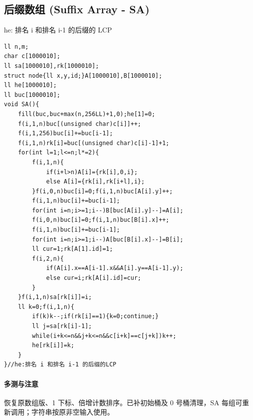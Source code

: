 \subsection{后缀数组 (Suffix Array - SA)}
he: 排名 i 和排名 i-1 的后缀的 LCP
\begin{lstlisting}
ll n,m;
char c[1000010];
ll sa[1000010],rk[1000010];
struct node{ll x,y,id;}A[1000010],B[1000010];
ll he[1000010];
ll buc[1000010];
void SA(){
    fill(buc,buc+max(n,256LL)+1,0);he[1]=0;
	f(i,1,n)buc[(unsigned char)c[i]]++;
	f(i,1,256)buc[i]+=buc[i-1];
	f(i,1,n)rk[i]=buc[(unsigned char)c[i]-1]+1;
	for(int l=1;l<=n;l*=2){
		f(i,1,n){
			if(i+l>n)A[i]={rk[i],0,i};
			else A[i]={rk[i],rk[i+l],i};
		}f(i,0,n)buc[i]=0;f(i,1,n)buc[A[i].y]++;
		f(i,1,n)buc[i]+=buc[i-1];
		for(int i=n;i>=1;i--)B[buc[A[i].y]--]=A[i];
		f(i,0,n)buc[i]=0;f(i,1,n)buc[B[i].x]++;
		f(i,1,n)buc[i]+=buc[i-1];
		for(int i=n;i>=1;i--)A[buc[B[i].x]--]=B[i];
		ll cur=1;rk[A[1].id]=1;
		f(i,2,n){
			if(A[i].x==A[i-1].x&&A[i].y==A[i-1].y);
			else cur=i;rk[A[i].id]=cur;
		}
	}f(i,1,n)sa[rk[i]]=i;
	ll k=0;f(i,1,n){
		if(k)k--;if(rk[i]==1){k=0;continue;}
		ll j=sa[rk[i]-1];
		while(i+k<=n&&j+k<=n&&c[i+k]==c[j+k])k++;
		he[rk[i]]=k;
	}
}//he:排名 i 和排名 i-1 的后缀的LCP
\end{lstlisting}

\paragraph{多测与注意} 恢复原数组版、1 下标、倍增计数排序。已补初始桶及 0 号桶清理，SA 每组可重新调用；字符串按原非空输入使用。
